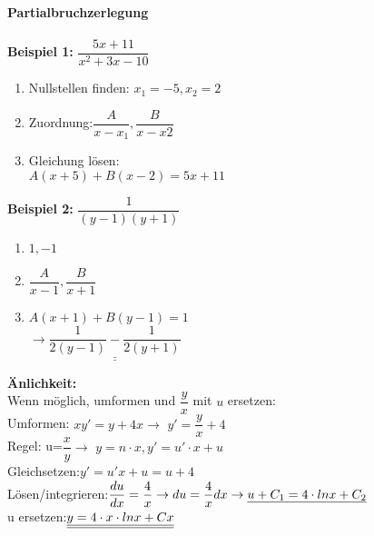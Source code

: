 \begin{figure}[!htb]
\begin{minipage}{0.3\textwidth}
\begin{tiny}
       \textbf{Partialbruchzerlegung}\\\\
        \textbf{Beispiel 1: } $\dfrac{5x+11}{x^2+3x-10}$\\
       \begin{enumerate}
           \item Nullstellen finden: $x_1=-5,x_2=2$
           \item Zuordnung:$\dfrac{A}{x-x_1},\dfrac{B}{x-x2}$
           \item Gleichung lösen:\\ $A(x+5)+B(x-2)=5x+11$
       \end{enumerate}
       \textbf{Beispiel 2:} $\dfrac{1}{(y-1)(y+1)}$\\
       \begin{enumerate}
           \item $1,-1$\\
        \item $\dfrac{A}{x-1},\dfrac{B}{x+1}$\\
        \item $A(x+1)+B(y-1)=1$\\
       $\rightarrow \underline{\underline{\dfrac{1}{2(y-1)}-\dfrac{1}{2(y+1)}}}$
       \end{enumerate}
       
        \textbf{Änlichkeit:}\\
        Wenn möglich, umformen und $\dfrac{y}{x}$ mit $u$ ersetzen:\\
        Umformen: $xy'=y+4x\rightarrow$ $y'=\dfrac{y}{x}+4$\\
        Regel: u=$\dfrac{x}{y}\rightarrow$ $y=n\cdot x, y'=u'\cdot x+u$\\
        Gleichsetzen:$y'=u'x+u=u+4$\\
        Lösen/integrieren:$\dfrac{du}{dx}=\dfrac{4}{x} \rightarrow du=\dfrac{4}{x}dx\\ 
        \rightarrow \underline{u+C_1=4\cdot lnx+C_2}$\\ u ersetzen:$\underline{\underline{y=4\cdot x\cdot lnx+Cx}}\\$
       \end{tiny}
    \end{minipage}
    \begin{minipage}{0.3\textwidth}
       \begin{tiny}

\end{tiny}
\end{minipage}
\end{figure}
